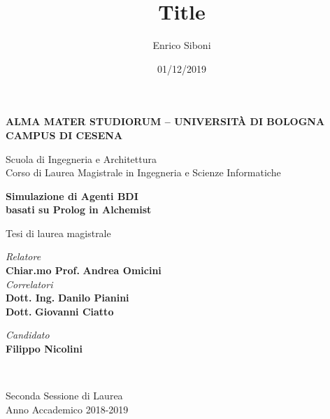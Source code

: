 \title{Title}
\author{Enrico Siboni}
\date{01/12/2019}

\begin{titlepage}
    \begin{center}
        
        \large
        \textbf{ALMA MATER STUDIORUM -- UNIVERSITÀ DI BOLOGNA \\ CAMPUS DI CESENA}
    	\\
        \noindent\hrulefill
        \vspace{0.4cm}
        
        \Large
        Scuola di Ingegneria e Architettura \\
        Corso di Laurea Magistrale in Ingegneria e Scienze Informatiche
        
        \Huge
        \vspace{4cm}
        \textbf{Simulazione di Agenti BDI\\
        basati su Prolog in Alchemist}

        \large
        \vspace{1cm}
        Tesi di laurea magistrale
        
        \vspace{5.5cm}
        \begin{minipage}[t]{0.64\textwidth}
            \begin{flushleft}
                \textit{Relatore} 
                \\ 
                \textbf{Chiar.mo Prof.} \textbf{Andrea Omicini} 
                \\
                \vspace{0.4cm}
                \textit{Correlatori} 
                \\ 
                \textbf{Dott. Ing.} \textbf{Danilo Pianini}
                \\
                \textbf{Dott.} \textbf{Giovanni Ciatto}
            \end{flushleft}
        \end{minipage}
        \begin{minipage}[t]{0.34\textwidth}
            \begin{flushright}
                \textit{Candidato} 
                \\ 
                \textbf{Filippo Nicolini}
            \end{flushright}
        \end{minipage}\\
        
        \vfill
        \noindent\hrulefill
        \vspace{0.3cm}
        \Large
        
        Seconda Sessione di Laurea
        \\
        Anno Accademico 2018-2019
    \end{center}
\end{titlepage}
\restoregeometry